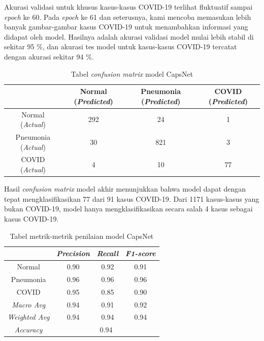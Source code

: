 \documentclass{article}
\begin{document}
   			\par Akurasi validasi untuk khusus kasus-kasus COVID-19 terlihat fluktuatif sampai \textit{epoch} ke 60. Pada \textit{epoch} ke 61 dan seterusnya, kami mencoba memasukan lebih banyak gambar-gambar kasus COVID-19 untuk menambahkan informasi yang didapat oleh model. Hasilnya adalah akurasi validasi model mulai lebih stabil di sekitar 95 \%, dan akurasi tes model untuk kasus-kasus COVID-19 tercatat dengan akurasi sekitar 94 \%.
   			
   			\begin{table}[H]
   			\begin{center}
   				\begin{tabular}{|c|c|c|c|}
   					\hline
   					& Normal (\textit{Predicted}) & Pneumonia (\textit{Predicted}) & COVID (\textit{Predicted}) \\
   					\hline
   					Normal (\textit{Actual}) & 292 & 24 & 1 \\
   					\hline
   					Pneumonia (\textit{Actual}) & 30 & 821 & 3 \\
   					\hline
   					COVID (\textit{Actual}) & 4 & 10 & 77 \\
   					\hline
   				\end{tabular}
   				\caption{Tabel \textit{confusion matrix} model CapsNet}
   			\end{center}
   			\end{table}
   			
   			\par Hasil \textit{confusion matrix} model akhir menunjukkan bahwa model dapat dengan tepat mengklasifikasikan 77 dari 91 kasus COVID-19. Dari 1171 kasus-kasus yang bukan COVID-19, model hanya mengklasifikasikan secara salah 4 kasus sebagai kasus COVID-19. 
   			
   			\begin{table}[H]
   			\begin{center}
   				\begin{tabular}{|c|c|c|c|}
   					\hline
   					& \textit{Precision} & \textit{Recall} & \textit{F1-score} \\
   					\hline
   					Normal & 0.90 & 0.92 & 0.91 \\
   					\hline
   					Pneumonia & 0.96 & 0.96 & 0.96 \\
   					\hline
   					COVID & 0.95 & 0.85 & 0.90 \\
   					\hline
   					\hline
   					\textit{Macro Avg} & 0.94 & 0.91 & 0.92 \\
   					\hline
   					\textit{Weighted Avg} & 0.94 & 0.94 & 0.94 \\
   					\hline
   					\hline
   					\textit{Accuracy} & \multicolumn{3}{|c|}{0.94} \\
   					\hline
   				\end{tabular}
   				\caption{Tabel metrik-metrik penilaian model CapsNet}
   			\end{center}
   			\end{table}
   			
\end{document}
